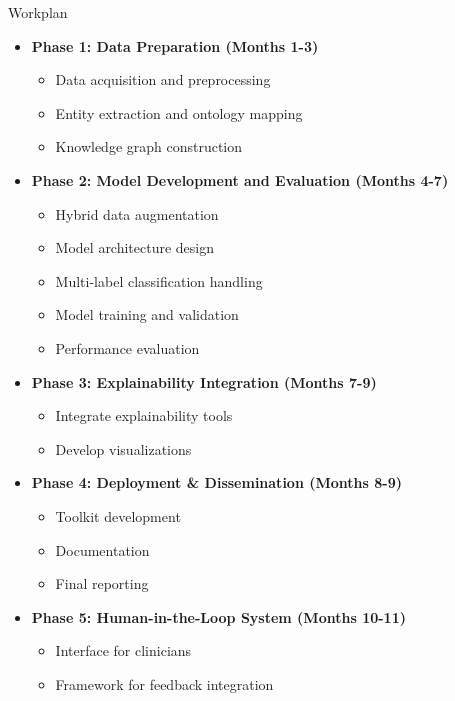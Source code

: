 \documentclass{beamer}
\begin{document}
\begin{frame}{Workplan}
    \begin{itemize}
        \item \textbf{Phase 1: Data Preparation (Months 1-3)}
        \begin{itemize}
            \item Data acquisition and preprocessing
            \item Entity extraction and ontology mapping
            \item Knowledge graph construction
        \end{itemize}
        \item \textbf{Phase 2: Model Development and Evaluation (Months 4-7)}
        \begin{itemize}
            \item Hybrid data augmentation
            \item Model architecture design
            \item Multi-label classification handling
            \item Model training and validation
            \item Performance evaluation
        \end{itemize}
        \item \textbf{Phase 3: Explainability Integration (Months 7-9)}
        \begin{itemize}
            \item Integrate explainability tools
            \item Develop visualizations
        \end{itemize}
        \item \textbf{Phase 4: Deployment \& Dissemination (Months 8-9)}
        \begin{itemize}
            \item Toolkit development
            \item Documentation
            \item Final reporting
        \end{itemize}
        \item \textbf{Phase 5: Human-in-the-Loop System (Months 10-11)}
        \begin{itemize}
            \item Interface for clinicians
            \item Framework for feedback integration
        \end{itemize}
    \end{itemize}
\end{frame}
\end{document}
